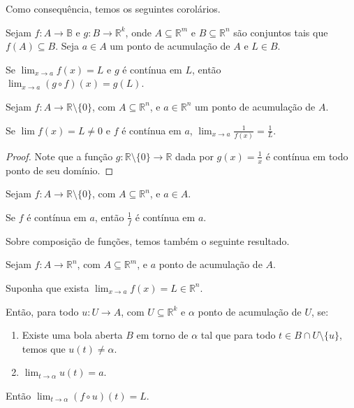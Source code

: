 Como consequência, temos os seguintes corolários.

\begin{corollary}
    Sejam $f: A \to \mathbb B$ e $g: B \to \mathbb R^k$, onde $A\subseteq \mathbb R^m$ e $B\subseteq \mathbb R^n$ são conjuntos tais que $f(A)\subseteq B$.
    Seja $a \in A$ um ponto de acumulação de $A$ e $L \in B$.

    Se $\lim_{x\to a} f(x) = L$ e $g$ é contínua em $L$, então $\lim_{x\to a} (g\circ f)(x) = g(L)$.
\end{corollary}

\begin{corollary}
    Sejam $f: A \to \mathbb R\setminus \{0\}$, com $A\subseteq \mathbb R^n$, e $a \in \mathbb R^n$ um ponto de acumulação de $A$.

    Se $\lim f(x) = L \neq 0$ e $f$ é contínua em $a$, $\lim _{x\to a} \frac{1}{f(x)} = \frac{1}{L}$.
\end{corollary}

\begin{proof}
    Note que a função $g:\mathbb R\setminus\{0\}\rightarrow \mathbb R$ dada por $g(x) = \frac{1}{x}$ é contínua em todo ponto de seu domínio.
\end{proof}

\begin{corollary}
    Sejam $f: A \to \mathbb R\setminus \{0\}$, com $A\subseteq \mathbb R^n$, e $a \in A$.

    Se $f$ é contínua em $a$, então $\frac{1}{f}$ é contínua em $a$.
\end{corollary}

Sobre composição de funções, temos também o seguinte resultado.
\begin{proposition}
    Sejam $f: A \rightarrow \mathbb R^n$, com $A\subseteq \mathbb R^m$, e $a$ ponto de acumulação de $A$.

    Suponha que exista $\lim_{x\to a} f(x) = L \in \mathbb R^n$.

    Então, para todo $u: U\rightarrow A$, com $U\subseteq \mathbb R^k$ e $\alpha$ ponto de acumulação de $U$, se:

    \begin{enumerate}[label=(\alph*)]
        \item Existe uma bola aberta $B$ em torno de $\alpha$ tal que para todo $t \in B\cap U\setminus\{u\}$, temos que $u(t)\neq \alpha$.
        \item $\lim_{t\to \alpha} u(t) = a$.
    \end{enumerate}

    Então $\lim_{t\to \alpha} (f\circ u)(t) = L$.
\end{proposition}

